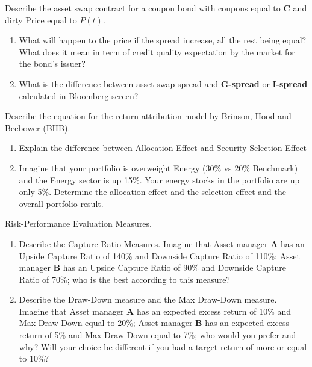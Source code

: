 \documentclass[12pt,a4paper]{exam}
\begin{document}
\begin{questions}

\question Describe the asset swap contract for a coupon bond with coupons equal to \textbf{C} and dirty Price equal to $P(t)$.	
\begin{enumerate}
\item What will happen to the price if the spread increase, all the rest being equal? What does it mean in term of credit quality expectation by the market for the bond's issuer?
\item What is the difference between asset swap spread and \textbf{G-spread} or \textbf{I-spread} calculated in Bloomberg screen?
\end{enumerate}
\fillwithlines{3cm}

\question Describe the equation for the return attribution model by Brinson, Hood and Beebower (BHB). 
\begin{enumerate}[label=(\alph*),font=\itshape]
\item Explain the difference between Allocation Effect and Security Selection Effect 
\item Imagine that your portfolio is overweight Energy (30\% vs 20\% Benchmark) and the Energy sector is up 15\%. Your energy stocks in the portfolio are up only 5\%. Determine the allocation effect and the selection effect and the overall portfolio result.
\end{enumerate}
\fillwithlines{3cm}

\question Risk-Performance Evaluation Measures.
\begin{enumerate}
\item Describe the Capture Ratio Measures. Imagine that Asset manager \textbf{A} has an Upside Capture Ratio of 140\% and Downside Capture Ratio of 110\%; Asset manager \textbf{B} has an Upside Capture Ratio of 90\% and Downside Capture Ratio of 70\%; who is the best according to this measure?
\item Describe the Draw-Down measure and the Max Draw-Down measure. Imagine that Asset manager \textbf{A} has an expected excess return of 10\% and Max Draw-Down equal to 20\%; Asset manager \textbf{B} has an expected excess return of 5\% and Max Draw-Down equal to 7\%; who would you prefer and why? Will your choice be different if you had a target return of more or equal to 10\%?

\end{enumerate}
\fillwithlines{3cm}


\end{questions}
\end{document}
